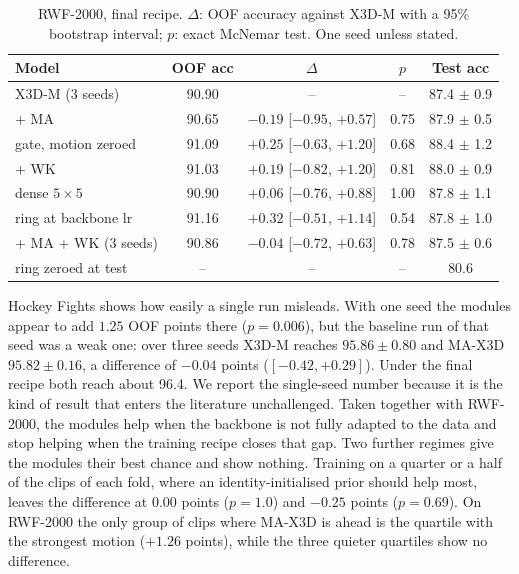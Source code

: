 \documentclass[conference]{IEEEtran}
\begin{document}
\begin{table}[t]
  \centering
  \caption{RWF-2000, final recipe. $\Delta$: OOF accuracy against X3D-M
  with a 95\% bootstrap interval; $p$: exact McNemar test. One seed unless
  stated.}
  \label{tab:ablation}
  \setlength{\tabcolsep}{2pt}
  \begin{tabular}{lcccc}
    \toprule
    Model & OOF acc & $\Delta$ & $p$ & Test acc \\
    \midrule
    X3D-M (3 seeds)            & 90.90 & --     & --   & 87.4 $\pm$ 0.9 \\
    + MA                       & 90.65 & $-0.19$ [$-0.95$, $+0.57$] & 0.75 & 87.9 $\pm$ 0.5 \\
    \quad gate, motion zeroed  & 91.09 & $+0.25$ [$-0.63$, $+1.20$] & 0.68 & 88.4 $\pm$ 1.2 \\
    + WK                       & 91.03 & $+0.19$ [$-0.82$, $+1.20$] & 0.81 & 88.0 $\pm$ 0.9 \\
    \quad dense $5\times5$     & 90.90 & $+0.06$ [$-0.76$, $+0.88$] & 1.00 & 87.8 $\pm$ 1.1 \\
    \quad ring at backbone lr  & 91.16 & $+0.32$ [$-0.51$, $+1.14$] & 0.54 & 87.8 $\pm$ 1.0 \\
    + MA + WK (3 seeds)        & 90.86 & $-0.04$ [$-0.72$, $+0.63$] & 0.78 & 87.5 $\pm$ 0.6 \\
    \quad ring zeroed at test  & --    & --     & --   & 80.6 \\
    \bottomrule
  \end{tabular}
\end{table}

Hockey Fights shows how easily a single run misleads. With one seed the
modules appear to add $1.25$ OOF points there ($p = 0.006$), but the
baseline run of that seed was a weak one: over three seeds X3D-M reaches
$95.86 \pm 0.80$ and MA-X3D $95.82 \pm 0.16$, a difference of $-0.04$
points ($[-0.42, +0.29]$). Under the final recipe both reach about 96.4.
We report the single-seed number because it is the kind of result that
enters the literature unchallenged. Taken together with RWF-2000, the modules help
when the backbone is not fully adapted to the data and stop helping when
the training recipe closes that gap. Two further regimes give the modules their best chance and show nothing.
Training on a quarter or a half of the clips of each fold, where an
identity-initialised prior should help most, leaves the difference at
$0.00$ points ($p = 1.0$) and $-0.25$ points ($p = 0.69$). On RWF-2000 the
only group of clips where MA-X3D is ahead is the quartile with the
strongest motion ($+1.26$ points), while the three quieter quartiles show
no difference.
\end{document}
